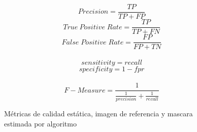 \begin{equation} \label{eq:precision}
Precision = \frac{TP}{TP + FP}
\end{equation}
\begin{equation} \label{eq:tpr}
True \: Positive \; Rate = \frac{TP}{TP+FN}
\end{equation}
\begin{equation} \label{eq:fpr}
False \; Positive \; Rate = \frac{FP}{FP + TN}
\end{equation}\\
\[
sensitivity = recall 
\]
\[
specificity = 1 - fpr
\]\\
\begin{equation} \label{eq:fmeasure}
F-Measure = \frac{1}{\frac{1}{precision} + \frac{1}{recall}}
\end{equation}

\begin{figure}
\centering     %
{}
\label{fig:metricas_calidad_estatica}
\caption[Métricas de calidad estática]{Métricas de calidad estática, imagen de referencia y mascara estimada por algoritmo}
\end{figure}


